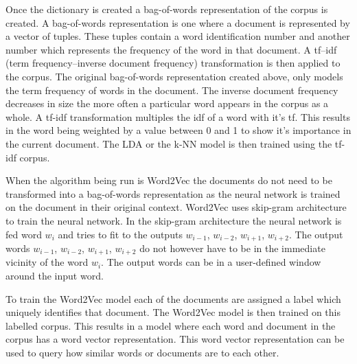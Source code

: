 Once the dictionary is created a bag-of-words representation of the corpus is created.
A bag-of-words representation is one where a document is represented by a vector of tuples.
These tuples contain a word identification number and another number which represents the frequency of the word in that document.
A tf–idf (term frequency–inverse document frequency) transformation is then applied to the corpus.
The original bag-of-words representation created above, only models the term frequency of words in the document.
The inverse document frequency decreases in size the more often a particular word appears in the corpus as a whole.
A tf-idf transformation multiples the idf of a word with it's tf.
This results in the word being weighted by a value between 0 and 1 to show it's importance in the current document.
The LDA or the k-NN model is then trained using the tf-idf corpus.

When the algorithm being run is Word2Vec the documents do not need to be transformed into a bag-of-words representation as the neural network is trained on the document in their original context.
Word2Vec uses skip-gram architecture to train the neural network.
In the skip-gram architecture the neural network is fed word \(w_{i}\) and tries to fit to the outputs \(w_{i-1}\), \(w_{i-2}\), \(w_{i+1}\), \(w_{i+2}\).
The output words \(w_{i-1}\), \(w_{i-2}\), \(w_{i+1}\), \(w_{i+2}\) do not however have to be in the immediate vicinity of the word \(w_{i}\).
The output words can be in a user-defined window around the input word.

To train the Word2Vec model each of the documents are assigned a label which uniquely identifies that document.
The Word2Vec model is then trained on this labelled corpus.
This results in a model where each word and document in the corpus has a word vector representation.
This word vector representation can be used to query how similar words or documents are to each other.


